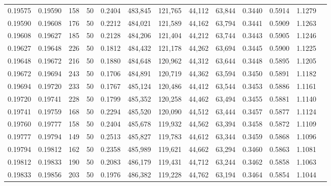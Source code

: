 \begin{tabular}{rrrrrrrrrrrrr}
0.19575 & 0.19590 &   158 &  50 &                                     0.2404 & 483,845 & 121,765 &  44,112 &  63,844 & 0.3440 & 0.5914 & 1.1279 \\
0.19590 & 0.19608 &   176 &  50 &                                     0.2212 & 484,021 & 121,589 &  44,162 &  63,794 & 0.3441 & 0.5909 & 1.1263 \\
0.19608 & 0.19627 &   185 &  50 &                                     0.2128 & 484,206 & 121,404 &  44,212 &  63,744 & 0.3443 & 0.5905 & 1.1246 \\
0.19627 & 0.19648 &   226 &  50 &                                     0.1812 & 484,432 & 121,178 &  44,262 &  63,694 & 0.3445 & 0.5900 & 1.1225 \\
0.19648 & 0.19672 &   216 &  50 &                                     0.1880 & 484,648 & 120,962 &  44,312 &  63,644 & 0.3448 & 0.5895 & 1.1205 \\
0.19672 & 0.19694 &   243 &  50 &                                     0.1706 & 484,891 & 120,719 &  44,362 &  63,594 & 0.3450 & 0.5891 & 1.1182 \\
0.19694 & 0.19720 &   233 &  50 &                                     0.1767 & 485,124 & 120,486 &  44,412 &  63,544 & 0.3453 & 0.5886 & 1.1161 \\
0.19720 & 0.19741 &   228 &  50 &                                     0.1799 & 485,352 & 120,258 &  44,462 &  63,494 & 0.3455 & 0.5881 & 1.1140 \\
0.19741 & 0.19759 &   168 &  50 &                                     0.2294 & 485,520 & 120,090 &  44,512 &  63,444 & 0.3457 & 0.5877 & 1.1124 \\
0.19760 & 0.19777 &   158 &  50 &                                     0.2404 & 485,678 & 119,932 &  44,562 &  63,394 & 0.3458 & 0.5872 & 1.1109 \\
0.19777 & 0.19794 &   149 &  50 &                                     0.2513 & 485,827 & 119,783 &  44,612 &  63,344 & 0.3459 & 0.5868 & 1.1096 \\
0.19794 & 0.19812 &   162 &  50 &                                     0.2358 & 485,989 & 119,621 &  44,662 &  63,294 & 0.3460 & 0.5863 & 1.1081 \\
0.19812 & 0.19833 &   190 &  50 &                                     0.2083 & 486,179 & 119,431 &  44,712 &  63,244 & 0.3462 & 0.5858 & 1.1063 \\
0.19833 & 0.19856 &   203 &  50 &                                     0.1976 & 486,382 & 119,228 &  44,762 &  63,194 & 0.3464 & 0.5854 & 1.1044 \\

\end{tabular}
